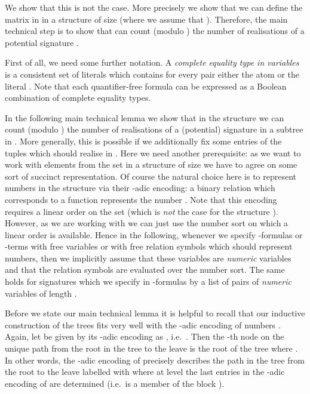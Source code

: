\documentclass[a4paper,UKenglish]{lipics}
\theoremstyle{plain}
\begin{document}
We show that this is not the case. More precisely we show
that we can define the matrix  in  in a 
structure of size  (where we assume that ). 
Therefore, the main technical 
step is to show that  can count (modulo ) the number of 
realisations of a potential signature .

\medskip
First of all, we need some further notation. A \emph{complete equality 
type in  variables}  is a consistent set  of literals 
which contains for every pair  either the atom  or the literal
. Note that each quantifier-free formula  can be 
expressed as a Boolean combination of complete equality types.

In the following main technical lemma we show that in the structure  we can count (modulo ) the number of 
realisations of a (potential) signature  in a 
subtree  in . More generally, this is possible  if 
we additionally 
fix some entries of the tuples which should realise  in 
.
Here we need another prerequisite: as we want to work with elements 
from the set  in a structure of size  we have to 
agree on some sort of succinct representation. 
Of course the natural choice here is 
to represent numbers  in the structure  via their 
-adic encoding: a binary relation  which corresponds to a function  
represents the number . Note that this encoding requires a linear order on the set  
(which is \emph{not} the case for the 
structure ). However, as we are working with  we can just use the 
number sort on which a linear order is available.
Hence in the following, whenever we specify -formulas or -terms 
with free variables or with free relation symbols which should represent 
numbers, then we implicitly assume that these variables are \emph{numeric} 
variables and that the relation symbols are evaluated over the number 
sort. The same holds for signatures  which we specify 
in -formulas by a list of pairs  of \emph{numeric} 
variables  of length .

Before we state our main technical lemma it is helpful to recall that our 
inductive construction of the trees  fits very well with the 
-adic encoding 
of numbers .
Again, let  be given by its -adic encoding as 
, i.e.\ . Then the -th node on the unique path from the root 
in the tree   to the leave  is the root of the tree 
 where . 
In other words, the -adic encoding of  precisely describes the 
path in the tree  from the root to the leave labelled with  where 
at level  the  last entries   in 
the -adic encoding of  are determined (i.e.\  is a member of the 
block ).
\end{document}
